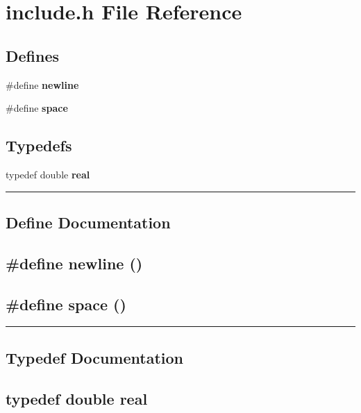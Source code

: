 \section{include.h File Reference}
\label{include.h}


\subsection*{Defines}
\begin{CompactItemize}
\item 
\#define {\bf newline}
\item 
\#define {\bf space}
\end{CompactItemize}
\subsection*{Typedefs}
\begin{CompactItemize}
\item 
typedef double {\bf real}
\end{CompactItemize}
\vspace{0.4cm}\hrule\vspace{0.2cm}
\subsection*{Define Documentation}
\label{include.h_a0}
\subsection{\setlength{\rightskip}{0pt plus 5cm}\#define newline ()}

\label{include.h_a1}
\subsection{\setlength{\rightskip}{0pt plus 5cm}\#define space ()}

\vspace{0.4cm}\hrule\vspace{0.2cm}
\subsection*{Typedef Documentation}
\label{include.h_a2}
\subsection{\setlength{\rightskip}{0pt plus 5cm}typedef double real}

